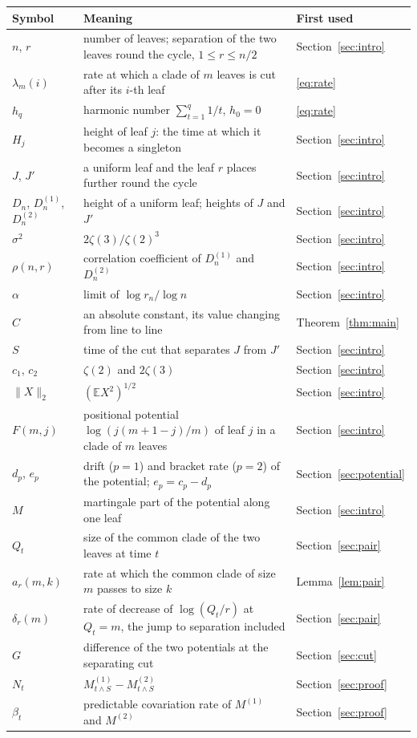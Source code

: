 \documentclass[11pt]{amsart}
\theoremstyle{remark}
\numberwithin{equation}{section}
\newcommand{\E}{\mathbb E}
\begin{document}
\begin{center}
\small
\begin{tabular}{@{}lp{}l@{}}
\toprule
Symbol & Meaning & First used\\
\midrule
$n$, $r$ & number of leaves; separation of the two leaves round the cycle, $1\le r\le n/2$ & Section~\ref{sec:intro}\\
$\lambda_m(i)$ & rate at which a clade of $m$ leaves is cut after its $i$-th leaf & \eqref{eq:rate}\\
$h_q$ & harmonic number $\sum_{t=1}^q1/t$, $h_0=0$ & \eqref{eq:rate}\\
$H_j$ & height of leaf $j$: the time at which it becomes a singleton & Section~\ref{sec:intro}\\
$J$, $J'$ & a uniform leaf and the leaf $r$ places further round the cycle & Section~\ref{sec:intro}\\
$D_n$, $D^{(1)}_n$, $D^{(2)}_n$ & height of a uniform leaf; heights of $J$ and $J'$ & Section~\ref{sec:intro}\\
$\sigma^2$ & $2\zeta(3)/\zeta(2)^3$ & Section~\ref{sec:intro}\\
$\rho(n,r)$ & correlation coefficient of $D^{(1)}_n$ and $D^{(2)}_n$ & Section~\ref{sec:intro}\\
$\alpha$ & limit of $\log r_n/\log n$ & Section~\ref{sec:intro}\\
$C$ & an absolute constant, its value changing from line to line & Theorem~\ref{thm:main}\\
$S$ & time of the cut that separates $J$ from $J'$ & Section~\ref{sec:intro}\\
$c_1$, $c_2$ & $\zeta(2)$ and $2\zeta(3)$ & Section~\ref{sec:intro}\\
$\|X\|_2$ & $(\E X^2)^{1/2}$ & Section~\ref{sec:intro}\\
$F(m,j)$ & positional potential $\log(j(m+1-j)/m)$ of leaf $j$ in a clade of $m$ leaves & Section~\ref{sec:intro}\\
$d_p$, $e_p$ & drift ($p=1$) and bracket rate ($p=2$) of the potential; $e_p=c_p-d_p$ & Section~\ref{sec:potential}\\
$M$ & martingale part of the potential along one leaf & Section~\ref{sec:intro}\\
$Q_t$ & size of the common clade of the two leaves at time $t$ & Section~\ref{sec:pair}\\
$a_r(m,k)$ & rate at which the common clade of size $m$ passes to size $k$ & Lemma~\ref{lem:pair}\\
$\delta_r(m)$ & rate of decrease of $\log(Q_t/r)$ at $Q_t=m$, the jump to separation included & Section~\ref{sec:pair}\\
$G$ & difference of the two potentials at the separating cut & Section~\ref{sec:cut}\\
$N_t$ & $M^{(1)}_{t\wedge S}-M^{(2)}_{t\wedge S}$ &Section~\ref{sec:proof}\\
$\beta_t$ & predictable covariation rate of $M^{(1)}$ and $M^{(2)}$ & Section~\ref{sec:proof}\\
\bottomrule
\end{tabular}
\end{center}
\end{document}
